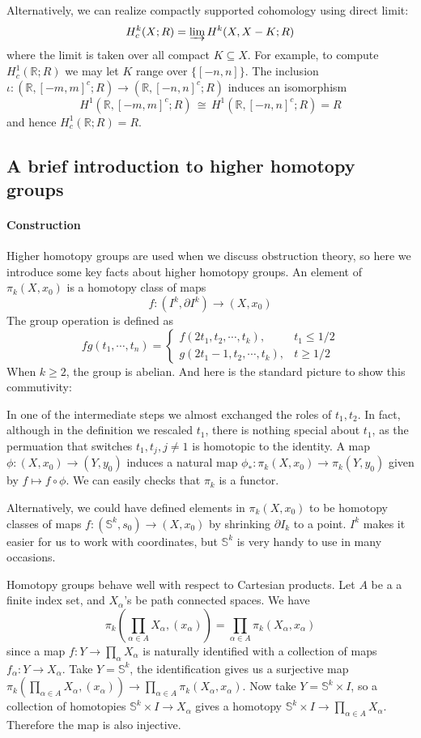 \documentclass[12pt]{article}
\theoremstyle{plain}
\theoremstyle{definition}
\newcommand{\IR}{\mathbb{R}}
\newcommand{\IS}{\mathbb{S}}
\newcommand\iso{\,{\cong}\,}
\newcommand{\<}{\langle}
\renewcommand{\>}{\rangle}
\newcommand{\p}{\partial}
\begin{document}
Alternatively, we can realize compactly supported cohomology using direct limit:
$$ H^k_c(X; R) = \varinjlim H^k(X, X - K; R) $$
where the limit is taken over all compact $K \subseteq X$. For example, to compute $H^1_c(\IR; R)$ we may let $K$ range over $\{[-n, n]\}$. The inclusion $\iota : (\IR, [-m, m]^c;R) \to (\IR, [-n, n]^c; R)$ induces an isomorphism $$H^1(\IR, [-m, m]^c; R) \iso H^1(\IR, [-n, n]^c; R) = R$$ and hence $H^1_c(\IR; R) = R$. 


\subsection{A brief introduction to higher homotopy groups}
\paragraph{Construction}
Higher homotopy groups are used when we discuss obstruction theory, so here we introduce some key facts about higher homotopy groups. 
An element of $\pi_k(X, x_0)$ is a homotopy class of maps 
$$ f : (I^k, \p I^k) \to (X, x_0) $$ The group operation is defined as 
$$ fg(t_1, \cdots, t_n) = \begin{cases}
f(2t_1, t_2, \cdots, t_k), & t_1 \le 1/2 \\
g(2t_1 - 1, t_2, \cdots, t_k), & t \ge 1/2
\end{cases}
$$
When $k \ge 2$, the group is abelian. And here is the standard picture to show this commutivity:

In one of the intermediate steps we almost exchanged the roles of $t_1, t_2$. In fact, although in the definition we rescaled $t_1$, there is nothing special about $t_1$, as the permuation that switches $t_1, t_j, j \neq 1$ is homotopic to the identity. A map $\phi : (X, x_0) \to (Y, y_0)$ induces a natural map $\phi_* : \pi_k(X, x_0) \to \pi_k(Y, y_0)$ given by $f \mapsto f \circ \phi$. We can easily checks that $\pi_k$ is a functor. 

Alternatively, we could have defined elements in $\pi_k(X, x_0)$ to be homotopy classes of maps $f : (\IS^k, s_0) \to (X, x_0)$ by shrinking $\p I_k$ to a point. $I^k$ makes it easier for us to work with coordinates, but $\IS^k$ is very handy to use in many occasions. 

Homotopy groups behave well with respect to Cartesian products. Let $A$ be a a finite index set, and $X_\alpha$'s be path connected spaces. We have
$$ \pi_k( \prod_{\alpha \in A} X_\alpha, (x_\alpha)) = \prod_{\alpha \in A} \pi_k(X_\alpha, x_\alpha) $$
since a map $f : Y \to \prod_\alpha X_\alpha$ is naturally identified with a collection of maps $f_\alpha : Y \to X_\alpha$. Take $Y = \IS^k$, the identification gives us a surjective map $\pi_k( \prod_{\alpha \in A} X_\alpha, (x_\alpha)) \to \prod_{\alpha \in A} \pi_k(X_\alpha, x_\alpha)$. Now take $Y = \IS^k \times I$, so a collection of homotopies $\IS^k \times I \to X_\alpha$ gives a homotopy $\IS^k \times I \to \prod_{\alpha \in A} X_\alpha$. Therefore the map is also injective. 
\end{document}
